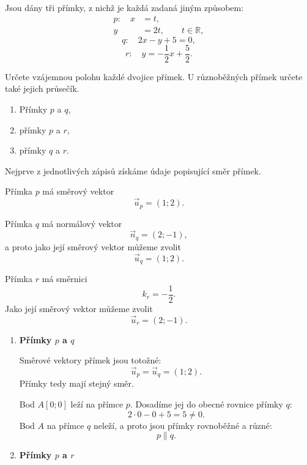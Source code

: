 \begin{example}\label{exa:Mixed_line_forms_summary}
    Jsou dány tři přímky, z nichž je každá zadaná jiným způsobem:
    \[
        \begin{aligned}
            p:\quad x&=t,\\
                     y&=2t,
                     \qquad t\in\mathbb{R},
        \end{aligned}
    \]
    \[
        q:\quad 2x-y+5=0,
    \]
    \[
        r:\quad y=-\frac12x+\frac52.
    \]

    Určete vzájemnou polohu každé dvojice přímek. U různoběžných
    přímek určete také jejich průsečík.

    \begin{enumerate}[label=\alph*)]
        \item Přímky $p$ a $q$,
        \item přímky $p$ a $r$,
        \item přímky $q$ a $r$.
    \end{enumerate}

    Nejprve z jednotlivých zápisů získáme údaje popisující směr
    přímek.

    Přímka $p$ má směrový vektor
    \[
        \vec{u}_p=(1;2).
    \]

    Přímka $q$ má normálový vektor
    \[
        \vec{n}_q=(2;-1),
    \]
    a proto jako její směrový vektor můžeme zvolit
    \[
        \vec{u}_q=(1;2).
    \]

    Přímka $r$ má směrnici
    \[
        k_r=-\frac12.
    \]
    Jako její směrový vektor můžeme zvolit
    \[
        \vec{u}_r=(2;-1).
    \]

    \begin{enumerate}[label=\alph*), leftmargin=2em]

        \item \textbf{Přímky $p$ a $q$}

        Směrové vektory přímek jsou totožné:
        \[
            \vec{u}_p=\vec{u}_q=(1;2).
        \]
        Přímky tedy mají stejný směr.

        Bod $A[0;0]$ leží na přímce $p$. Dosadíme jej do obecné rovnice
        přímky $q$:
        \[
            2\cdot0-0+5=5\neq0.
        \]
        Bod $A$ na přímce $q$ neleží, a proto jsou přímky rovnoběžné
        a různé:
        \[
            p\parallel q.
        \]

        \item \textbf{Přímky $p$ a $r$}


\end{enumerate}
\end{example}
